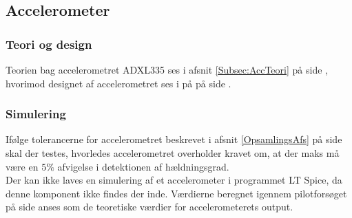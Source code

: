 \subsection{Accelerometer}
\subsubsection{Teori og design}
Teorien bag accelerometret ADXL335 ses i afsnit \ref{Subsec:AccTeori} på side \pageref{Subsec:AccTeori}, hvorimod designet af accelerometret ses i på  på side \pageref{pforsoeg1}.

\subsubsection{Simulering}
Ifølge tolerancerne for accelerometret beskrevet i afsnit \ref{OpsamlingsAfs} på side \pageref{OpsamlingsAfs} skal der testes, hvorledes accelerometret overholder kravet om, at der maks må være en $5\%$ afvigelse i detektionen af hældningsgrad. \\
Der kan ikke laves en simulering af et accelerometer i programmet LT Spice, da denne komponent ikke findes der inde. Værdierne beregnet igennem pilotforsøget på side \pageref{Sec:Pilotforsoeg} anses som de teoretiske værdier for accelerometerets output.

